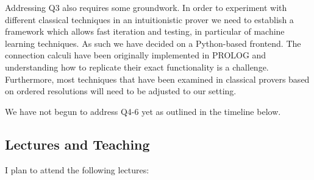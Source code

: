 \documentclass{article}
\theoremstyle{definition}
\theoremstyle{definition}
\theoremstyle{definition}
\theoremstyle{definition}
\theoremstyle{definition}
\theoremstyle{definition}
\theoremstyle{definition}
\newcommand{\0}{\mathbf 0}
\newcommand{\1}{\mathbf 1}
\begin{document}
	Addressing Q3 also requires some groundwork. In order to experiment with different classical techniques in an intuitionistic prover we need to establish a framework which allows fast iteration and testing, in particular of machine learning techniques. As such we have decided on a Python-based frontend. The connection calculi have been originally implemented in PROLOG and understanding how to replicate their exact functionality is a challenge. Furthermore, most techniques that have been examined in classical provers based on ordered resolutions will need to be adjusted to our setting.

	We have not begun to address Q4-6 yet as outlined in the timeline below.

	\subsection{Lectures and Teaching}

	I plan to attend the following lectures:
\end{document}
